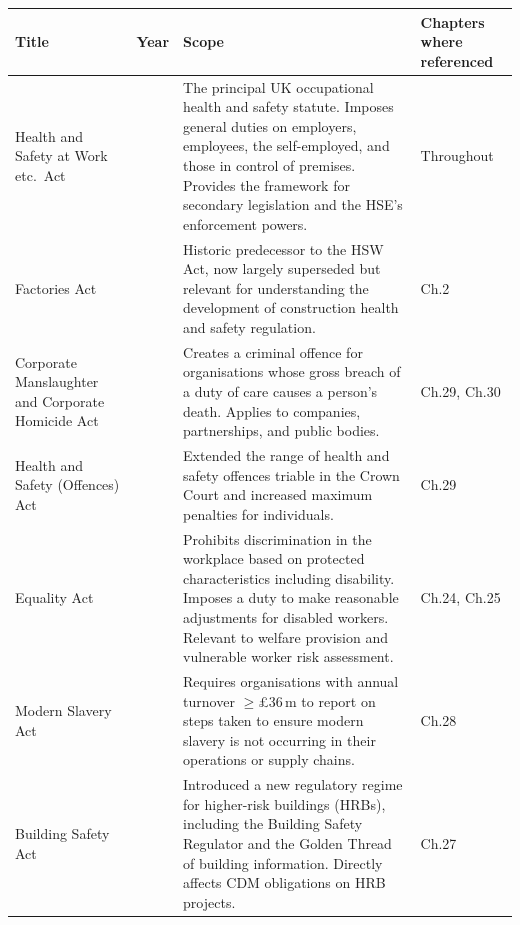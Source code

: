 \begin{table}[H]
\centering
\small
\begin{tabularx}{\textwidth}{>{\raggedright\arraybackslash}p{4.0cm}>{\centering\arraybackslash}p{1.0cm}>{\raggedright\arraybackslash}p{5.0cm}>{\raggedright\arraybackslash}X}
\toprule
\textbf{Title} & \textbf{Year} & \textbf{Scope} & \textbf{Chapters where referenced} \\
\midrule
Health and Safety at Work etc.\ Act & 1974 & The principal UK occupational health and safety statute. Imposes general duties on employers, employees, the self-employed, and those in control of premises. Provides the framework for secondary legislation and the HSE's enforcement powers. & Throughout \\
\midrule
Factories Act & 1961 & Historic predecessor to the HSW Act, now largely superseded but relevant for understanding the development of construction health and safety regulation. & Ch.2 \\
\midrule
Corporate Manslaughter and Corporate Homicide Act & 2007 & Creates a criminal offence for organisations whose gross breach of a duty of care causes a person's death. Applies to companies, partnerships, and public bodies. & Ch.29, Ch.30 \\
\midrule
Health and Safety (Offences) Act & 2008 & Extended the range of health and safety offences triable in the Crown Court and increased maximum penalties for individuals. & Ch.29 \\
\midrule
Equality Act & 2010 & Prohibits discrimination in the workplace based on protected characteristics including disability. Imposes a duty to make reasonable adjustments for disabled workers. Relevant to welfare provision and vulnerable worker risk assessment. & Ch.24, Ch.25 \\
\midrule
Modern Slavery Act & 2015 & Requires organisations with annual turnover $\geq$\pounds36\,m to report on steps taken to ensure modern slavery is not occurring in their operations or supply chains. & Ch.28 \\
\midrule
Building Safety Act & 2022 & Introduced a new regulatory regime for higher-risk buildings (HRBs), including the Building Safety Regulator and the Golden Thread of building information. Directly affects CDM obligations on HRB projects. & Ch.27 \\
\bottomrule
\end{tabularx}
\end{table}

